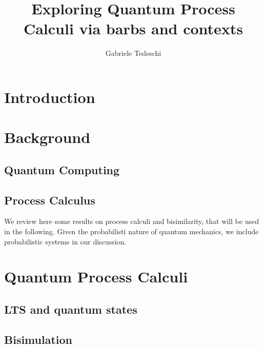 \documentclass[10pt,a4paper, titlepage]{report}
\title{Exploring Quantum Process Calculi via barbs and contexts }
\author{Gabriele Tedeschi}
\theoremstyle{remark}
\begin{document}
\maketitle

\tableofcontents

\chapter{Introduction}



\chapter{Background}

\section{Quantum Computing}


\section{Process Calculus}
We review here some results on
process calculi and bisimilarity, that will
be used in the following.
Given the probabilisti nature of quantum
mechanics, we include probabilistic systems
in our discussion.
	





\chapter{Quantum Process Calculi}\label{chapter3}



\section{LTS and quantum states}


\section{Bisimulation}\label{stateOfTheAr_Bisimulation}

\end{document}
